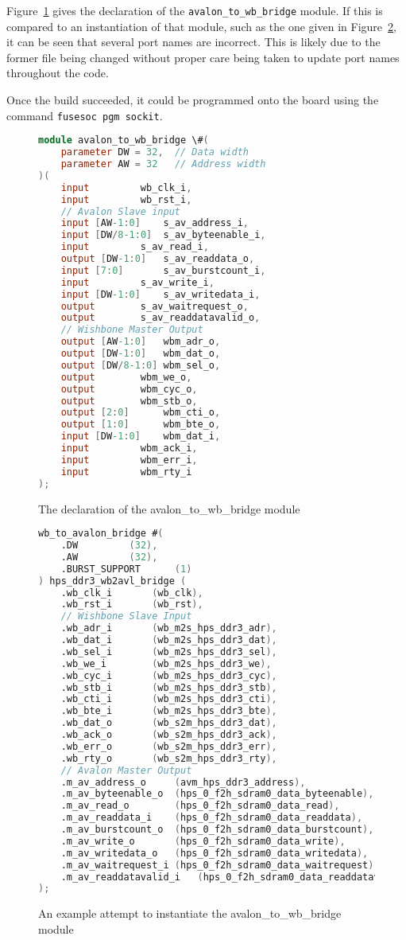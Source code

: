 Figure~\ref{fig:wb_dec} gives the declaration of the \verb|avalon_to_wb_bridge| module. If this is compared to an instantiation of that module, such as the one given in Figure~\ref{fig:wb_inst}, it can be seen that several port names are incorrect. This is likely due to the former file being changed without proper care being taken to update port names throughout the code.

Once the build succeeded, it could be programmed onto the board using the command \texttt{fusesoc pgm sockit}.

\begin{figure}[t]
  \centering
  \begin{lstlisting}[language=Verilog]
module avalon_to_wb_bridge \#(
	parameter DW = 32,	// Data width
	parameter AW = 32	// Address width
)(
	input 		  wb_clk_i,
	input 		  wb_rst_i,
	// Avalon Slave input
	input [AW-1:0] 	  s_av_address_i,
	input [DW/8-1:0]  s_av_byteenable_i,
	input 		  s_av_read_i,
	output [DW-1:0]   s_av_readdata_o,
	input [7:0] 	  s_av_burstcount_i,
	input 		  s_av_write_i,
	input [DW-1:0] 	  s_av_writedata_i,
	output 		  s_av_waitrequest_o,
	output 		  s_av_readdatavalid_o,
	// Wishbone Master Output
	output [AW-1:0]   wbm_adr_o,
	output [DW-1:0]   wbm_dat_o,
	output [DW/8-1:0] wbm_sel_o,
	output 		  wbm_we_o,
	output 		  wbm_cyc_o,
	output 		  wbm_stb_o,
	output [2:0] 	  wbm_cti_o,
	output [1:0] 	  wbm_bte_o,
	input [DW-1:0] 	  wbm_dat_i,
	input 		  wbm_ack_i,
	input 		  wbm_err_i,
	input 		  wbm_rty_i
);
  \end{lstlisting}
  \caption{The declaration of the avalon\_to\_wb\_bridge module\cite{wb_dec}}
  \label{fig:wb_dec}
\end{figure}

\begin{figure}[t]
  \centering
  \begin{lstlisting}[language=Verilog]
wb_to_avalon_bridge #(
	.DW			(32),
	.AW			(32),
	.BURST_SUPPORT		(1)
) hps_ddr3_wb2avl_bridge (
	.wb_clk_i		(wb_clk),
	.wb_rst_i		(wb_rst),
	// Wishbone Slave Input
	.wb_adr_i		(wb_m2s_hps_ddr3_adr),
	.wb_dat_i		(wb_m2s_hps_ddr3_dat),
	.wb_sel_i		(wb_m2s_hps_ddr3_sel),
	.wb_we_i		(wb_m2s_hps_ddr3_we),
	.wb_cyc_i		(wb_m2s_hps_ddr3_cyc),
	.wb_stb_i		(wb_m2s_hps_ddr3_stb),
	.wb_cti_i		(wb_m2s_hps_ddr3_cti),
	.wb_bte_i		(wb_m2s_hps_ddr3_bte),
	.wb_dat_o		(wb_s2m_hps_ddr3_dat),
	.wb_ack_o		(wb_s2m_hps_ddr3_ack),
	.wb_err_o		(wb_s2m_hps_ddr3_err),
	.wb_rty_o		(wb_s2m_hps_ddr3_rty),
	// Avalon Master Output
	.m_av_address_o		(avm_hps_ddr3_address),
	.m_av_byteenable_o	(hps_0_f2h_sdram0_data_byteenable),
	.m_av_read_o		(hps_0_f2h_sdram0_data_read),
	.m_av_readdata_i	(hps_0_f2h_sdram0_data_readdata),
	.m_av_burstcount_o	(hps_0_f2h_sdram0_data_burstcount),
	.m_av_write_o		(hps_0_f2h_sdram0_data_write),
	.m_av_writedata_o	(hps_0_f2h_sdram0_data_writedata),
	.m_av_waitrequest_i	(hps_0_f2h_sdram0_data_waitrequest),
	.m_av_readdatavalid_i	(hps_0_f2h_sdram0_data_readdatavalid)
);
  \end{lstlisting}
  \caption{An example attempt to instantiate the avalon\_to\_wb\_bridge module\cite{wb_inst}}
  \label{fig:wb_inst}
\end{figure}


